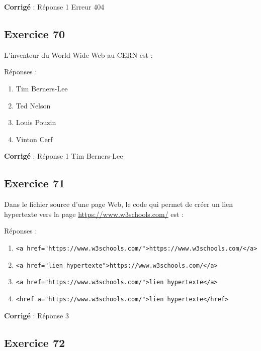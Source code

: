 \documentclass[11pt]{article}
\begin{document}
    \textbf{Corrigé} : Réponse 1 Erreur 404

    \hypertarget{exercice-70}{%
\subsection{Exercice 70}\label{exercice-70}}

L'inventeur du World Wide Web au CERN est :

Réponses :

\begin{enumerate}
\def\labelenumi{\arabic{enumi}.}
\item
  Tim Berners-Lee
\item
  Ted Nelson
\item
  Louis Pouzin
\item
  Vinton Cerf
\end{enumerate}

    \textbf{Corrigé} : Réponse 1 Tim Berners-Lee

    \hypertarget{exercice-71}{%
\subsection{Exercice 71}\label{exercice-71}}

Dans le fichier source d'une page Web, le code qui permet de créer un
lien hypertexte vers la page \url{https://www.w3schools.com/} est :

Réponses :

\begin{enumerate}
\def\labelenumi{\arabic{enumi}.}
\item
  \texttt{\textless{}a\ href="https://www.w3schools.com/"\textgreater{}https://www.w3schools.com/\textless{}/a\textgreater{}}
\item
  \texttt{\textless{}a\ href="lien\ hypertexte"\textgreater{}https://www.w3schools.com/\textless{}/a\textgreater{}}
\item
  \texttt{\textless{}a\ href="https://www.w3schools.com/"\textgreater{}lien\ hypertexte\textless{}/a\textgreater{}}
\item
  \texttt{\textless{}href\ a="https://www.w3schools.com/"\textgreater{}lien\ hypertexte\textless{}/href\textgreater{}}
\end{enumerate}

    \textbf{Corrigé} : Réponse 3

    \hypertarget{exercice-72}{%
\subsection{Exercice 72}\label{exercice-72}}
\end{document}
